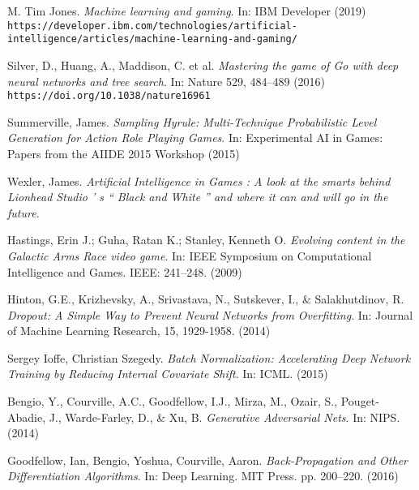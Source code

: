 \begin{thebibliography}{9}
 M. Tim Jones. \textit{Machine learning and gaming}. In: IBM Developer (2019)\\
\texttt{https://developer.ibm.com/technologies/artificial-intelligence/articles/machine-learning-and-gaming/}

 Silver, D., Huang, A., Maddison, C. et al. \textit{Mastering the game of Go with deep neural networks and tree search}. In: Nature 529, 484–489 (2016)\\
\texttt{https://doi.org/10.1038/nature16961}

 Summerville, James. \textit{Sampling Hyrule: Multi-Technique Probabilistic Level Generation for Action Role Playing Games}. In: Experimental AI in Games: Papers from the AIIDE 2015 Workshop (2015)

Wexler, James. \textit{Artificial Intelligence in Games : A look at the smarts behind Lionhead Studio ’ s “ Black and White ” and where it can and will go in the future}.

Hastings, Erin J.; Guha, Ratan K.; Stanley, Kenneth O. \textit{Evolving content in the Galactic Arms Race video game}. In: IEEE Symposium on Computational Intelligence and Games. IEEE: 241–248. (2009)

 Hinton, G.E., Krizhevsky, A., Srivastava, N., Sutskever, I., \& Salakhutdinov, R. \textit{Dropout:  A Simple Way to Prevent Neural Networks from Overfitting}. In: Journal of Machine Learning Research, 15, 1929-1958. (2014)

 Sergey Ioffe, Christian Szegedy. \textit{Batch Normalization: Accelerating Deep Network Training by Reducing Internal Covariate Shift}. In: ICML. (2015)

 Bengio, Y., Courville, A.C., Goodfellow, I.J., Mirza, M., Ozair, S., Pouget-Abadie, J., Warde-Farley, D., \& Xu, B. \textit{Generative Adversarial Nets}. In: NIPS. (2014)

 Goodfellow, Ian, Bengio, Yoshua, Courville, Aaron. \textit{Back-Propagation and Other Differentiation Algorithms}. In: Deep Learning. MIT Press. pp. 200–220. (2016)

\end{thebibliography}